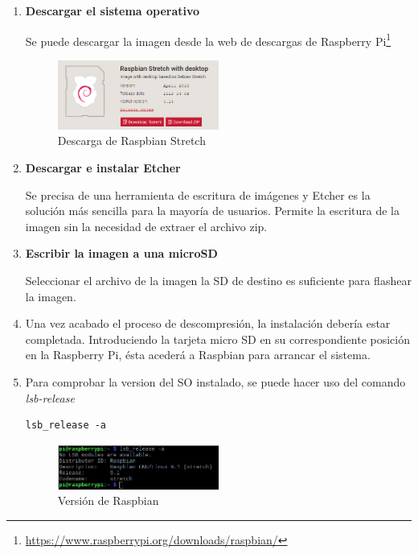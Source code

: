 \begin{enumerate}
\item \textbf{Descargar el sistema operativo}

Se puede descargar la imagen desde la web de descargas de Raspberry Pi\footnote{\url{https://www.raspberrypi.org/downloads/raspbian/}}

\begin{figure}[tb]
\centering
\includegraphics[width=0.5\textwidth]{figuras/RaspbianDwIcon.png}
\caption{Descarga de Raspbian Stretch}
\label{fig:descargaRaspbian}
\end{figure}

\item \textbf{Descargar e instalar Etcher}

Se precisa de una herramienta de escritura de imágenes y Etcher es la solución más sencilla para la mayoría de usuarios. Permite la escritura de la imagen sin la necesidad de extraer el archivo zip. 


\item \textbf{Escribir la imagen a una microSD}

Seleccionar el archivo de la imagen  la SD de destino es suficiente para flashear la imagen.

\item Una vez acabado el proceso de descompresión, la instalación debería estar completada. Introduciendo la tarjeta micro SD en su correspondiente posición en la Raspberry Pi, ésta acederá a Raspbian para arrancar el sistema.

\item Para comprobar la version del SO instalado, se puede hacer uso del comando \textit{lsb-release}

\begin{lstlisting}[frame=single, label=command:lsb]
lsb_release -a
\end{lstlisting}

\begin{figure}[tb]
\centering
\includegraphics[width=0.5\textwidth]{figuras/RaspbianVersion.png}
\caption{Versión de Raspbian}
\label{fig:versionRaspbian}
\end{figure}

\end{enumerate}


